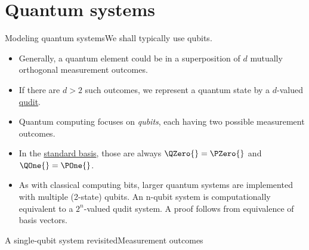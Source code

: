 \section{Quantum systems}

\begin{frame}{Modeling quantum systems}{We shall typically use qubits.}
\begin{itemize}
    \item<1-> Generally, a quantum element could be in a superposition of $d$ mutually orthogonal measurement outcomes.
    \item<2-> If there are $d>2$ such outcomes, we represent a quantum state by a $d$-valued 
    \href{https://en.wiktionary.org/wiki/qudit}{qudit}. 
    \item<4-> Quantum computing focuses on \emph{qubits}, each having two possible measurement outcomes.
    \item<5-> In the \href{https://en.wikipedia.org/wiki/Qubit\#Qubit_states}{standard basis}, those are always $\QZero{}=\PZero{}$ and $\QOne{} = \POne{}$.
    \item<6-> As with classical computing bits, larger quantum systems are implemented with multiple (2-state) qubits. An n-qubit system is computationally equivalent to a $2^{n}$-valued qudit system. A proof follows from equivalence of basis vectors.
\end{itemize}
\end{frame}

\begin{frame}{A single-qubit system revisited}{Measurement outcomes}
\end{frame}

